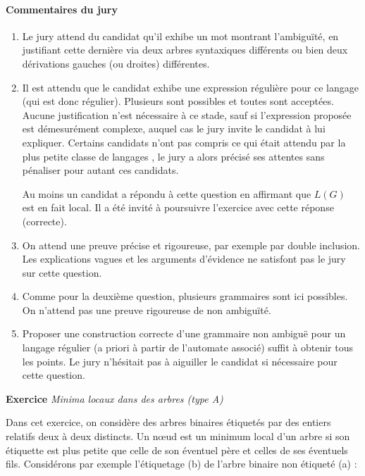 \documentclass[a4paper, 11pt]{article}
\newcounter{exocntr}
\newcommand{\exocommand}[1]{\stepcounter{exocntr} \textbf{Exercice \arabic{exocntr}} \textit{#1}}
\begin{document}
\paragraph{Commentaires du jury}

\begin{enumerate}
\item Le jury attend du candidat qu'il exhibe un mot montrant l'ambiguïté, en justifiant cette dernière via deux arbres syntaxiques différents ou bien deux dérivations gauches (ou droites) différentes.
\item Il est attendu que le candidat exhibe une expression régulière pour ce langage (qui est donc régulier). Plusieurs sont possibles et toutes sont acceptées. Aucune justification n'est nécessaire à ce stade, sauf si l'expression proposée est démesurément complexe, auquel cas le jury invite le candidat à lui expliquer. Certains candidats n'ont pas compris ce qui était attendu par \guillemotleft la plus petite classe de langages \guillemotright, le jury a alors précisé ses attentes sans pénaliser pour autant ces candidats.

Au moins un candidat a répondu à cette question en affirmant que $L(G)$ est en fait local. Il a été invité à poursuivre l'exercice avec cette réponse (correcte).
\item On attend une preuve précise et rigoureuse, par exemple par double inclusion. Les explications vagues et les arguments d'évidence ne satisfont pas le jury sur cette question.
\item Comme pour la deuxième question, plusieurs grammaires sont ici possibles. On n'attend pas une preuve rigoureuse de non ambiguïté.
\item Proposer une construction correcte d'une grammaire non ambiguë pour un langage régulier (a priori à partir de l'automate associé) suffit à obtenir tous les points. Le jury n'hésitait pas à aiguiller le candidat si nécessaire pour cette question.
\end{enumerate}

\newpage

\exocommand{Minima locaux dans des arbres (type A)}

Dans cet exercice, on considère des arbres binaires étiquetés par des entiers relatifs deux à deux distincts. Un n\oe{}ud est un minimum local d'un arbre si son étiquette est plus petite que celle de son
éventuel père et celles de ses éventuels fils. Considérons par exemple l'étiquetage (b) de l'arbre binaire non
étiqueté (a) :
\end{document}
